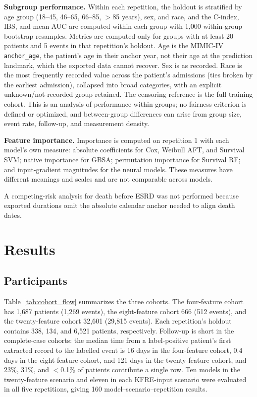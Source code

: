 \documentclass[10pt,letterpaper]{article}
\begin{document}
\textbf{Subgroup performance.} Within each repetition, the holdout is stratified by age group (18--45, 46--65, 66--85, $>$85 years), sex, and race, and the C-index, IBS, and mean AUC are computed within each group with 1{,}000 within-group bootstrap resamples. Metrics are computed only for groups with at least 20 patients and 5 events in that repetition's holdout. Age is the MIMIC-IV \texttt{anchor\_age}, the patient's age in their anchor year, not their age at the prediction landmark, which the exported data cannot recover. Sex is as recorded. Race is the most frequently recorded value across the patient's admissions (ties broken by the earliest admission), collapsed into broad categories, with an explicit unknown/not-recorded group retained. The censoring reference is the full training cohort. This is an analysis of performance within groups; no fairness criterion is defined or optimized, and between-group differences can arise from group size, event rate, follow-up, and measurement density.

\textbf{Feature importance.} Importance is computed on repetition 1 with each model's own measure: absolute coefficients for Cox, Weibull AFT, and Survival SVM; native importance for GBSA; permutation importance for Survival RF; and input-gradient magnitudes for the neural models. These measures have different meanings and scales and are not comparable across models.

A competing-risk analysis for death before ESRD was not performed because exported durations omit the absolute calendar anchor needed to align death dates.


\section*{Results}\label{sec:results}

\subsection*{Participants}
Table~\ref{tab:cohort_flow} summarizes the three cohorts. The four-feature cohort has 1{,}687 patients (1{,}269 events), the eight-feature cohort 666 (512 events), and the twenty-feature cohort 32{,}601 (29{,}815 events). Each repetition's holdout contains 338, 134, and 6{,}521 patients, respectively. Follow-up is short in the complete-case cohorts: the median time from a label-positive patient's first extracted record to the labelled event is 16 days in the four-feature cohort, 0.4 days in the eight-feature cohort, and 121 days in the twenty-feature cohort, and 23\%, 31\%, and $<$0.1\% of patients contribute a single row. Ten models in the twenty-feature scenario and eleven in each KFRE-input scenario were evaluated in all five repetitions, giving 160 model--scenario--repetition results.
\end{document}
